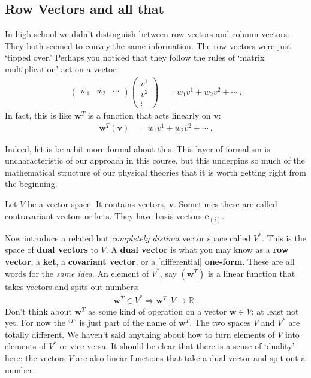 \documentclass[12pt]{article}
\numberwithin{equation}{section}    %
\renewcommand{\vec}[1]{\mathbf{#1}} %
\begin{document}
\subsection{Row Vectors and all that}

In high school we didn’t distinguish between row vectors and column vectors. They both seemed to convey the same information. The row vectors were just `tipped over.’ Perhaps you noticed that they follow the rules of `matrix multiplication’ act on a vector:
\begin{align}
  \begin{pmatrix}
    w_1 & w_2 & \cdots
  \end{pmatrix}
  \begin{pmatrix}
    v^1 \\
    v^2 \\
    \vdots
  \end{pmatrix}
  &= 
  w_1 v^1 + w_2 v^2 + \cdots \ .
\end{align}
In fact, this is like $\vec{w}^T$ is a function that acts linearly on $\vec{v}$: 
\begin{align}
  \vec{w}^T(\vec v) &= w_1 v^1 + w_2 v^2 + \cdots \ .
\end{align}

Indeed, let is be a bit more formal about this. This layer of formalism is uncharacteristic of our approach in this course, but this underpins so much of the mathematical structure of our physical theories that it is worth getting right from the beginning. 

Let $V$ be a vector space. It contains vectors, $\vec{v}$. Sometimes these are called contravariant vectors or kets. They have basis vectors $\vec{e}_{(i)}$. 

Now introduce a related but \emph{completely distinct} vector space called $V^*$. This is the space of \textbf{dual vectors} to $V$. A \textbf{dual vector} is what you may know as a \textbf{row vector}, a \textbf{ket}, a \textbf{covariant vector}, or a [differential] \textbf{one-form}. These are all words for the \emph{same idea}. An element of $V^*$, say $(\vec{w}^T)$ is a linear function that takes vectors and spits out numbers:
\begin{align}
  \vec{w}^T \in V^* \Rightarrow \vec{w}^T: V \to \mathbb{R} \ .
 \end{align}
Don’t think about $\vec{w}^T$ as some kind of operation on a vector $\vec{w}\in V$; at least not yet. For now the `$^T$' is just part of the name of $\vec{w}^T$. The two spaces $V$ and $V^*$ are totally different. We haven’t said anything about how to turn elements of $V$ into elements of $V^*$ or vice versa.
%
It should be clear that there is a sense of `duality’ here: the vectors $V$ are also linear functions that take a dual vector and spit out a number. 
\end{document}

